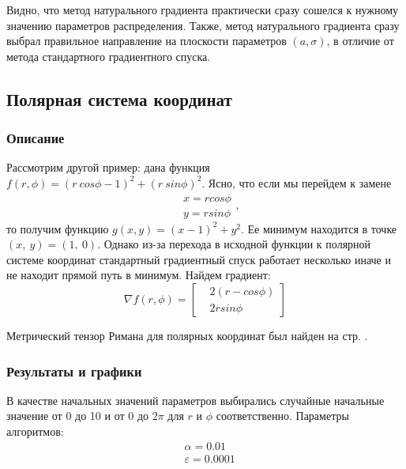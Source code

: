 \documentclass[a4paper,12pt]{article}
\begin{document}
        Видно, что метод натурального градиента практически сразу сошелся к нужному значению параметров распределения.
        Также, метод натурального градиента сразу выбрал правильное направление на плоскости параметров $(a, \sigma)$, 
        в отличие от метода стандартного градиентного спуска.

\newpage

\subsection{Полярная система координат}
\subsubsection{Описание}
        Рассмотрим другой пример: дана функция $f(r, \phi) = (r ~ cos \phi -1)^2 + (r ~ sin \phi)^2$.
        Ясно, что если мы перейдем к замене
        $$
            \begin{aligned}
                & x = r cos \phi \\
                & y = r sin \phi
            \end{aligned},
        $$
        то получим функцию $g(x, y) = (x - 1)^2 + y^2$. Ее минимум находится в точке $(x,~ y) = (1,~ 0)$. Однако из-за
        перехода в исходной функции к полярной системе координат стандартный градиентный спуск работает несколько иначе и не находит прямой путь в минимум.
        Найдем градиент:
        $$
            \nabla f(r, \phi) = 
            \left[
                \begin{aligned}
                    & 2(r - cos \phi) \\
                    & 2r sin \phi
                \end{aligned}
            \right]
        $$
        
        Метрический тензор Римана для полярных координат был найден на стр. \pageref{PolarTensor}.
        \newpage

\subsubsection{Результаты и графики}

        В качестве начальных значений параметров выбирались случайные начальные значение от 0 до 10 и от 0 до $2\pi$ для $r$ и $\phi$ соответственно.
        Параметры алгоритмов:
        $$
            \begin{aligned}
                & \alpha = 0.01 \\
                & \varepsilon = 0.0001
            \end{aligned}
        $$
\end{document}
